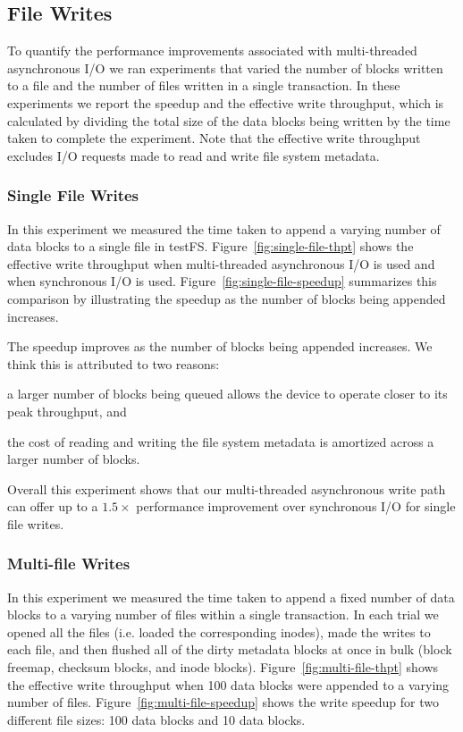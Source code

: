 \subsection{File Writes}
To quantify the performance improvements associated with multi-threaded
asynchronous I/O we ran experiments that varied the number of blocks written to
a file and the number of files written in a single transaction. In these
experiments we report the speedup and the effective write throughput, which is
calculated by dividing the total size of the data blocks being written by the
time taken to complete the experiment. Note that the effective write throughput
excludes I/O requests made to read and write file system metadata.

\subsubsection{Single File Writes}
In this experiment we measured the time taken to append a varying number of
data blocks to a single file in testFS. Figure~\ref{fig:single-file-thpt} shows
the effective write throughput when multi-threaded asynchronous I/O is used and
when synchronous I/O is used. Figure~\ref{fig:single-file-speedup} summarizes
this comparison by illustrating the speedup as the number of blocks being
appended increases.

The speedup improves as the number of blocks being appended increases. We think
this is attributed to two reasons:
\begin{enumerate*}[label={(\roman*)}]
  \item a larger number of blocks being queued allows the device to operate
    closer to its peak throughput, and
  \item the cost of reading and writing the file system metadata is amortized
    across a larger number of blocks.
\end{enumerate*}
Overall this experiment shows that our multi-threaded asynchronous write path
can offer up to a $1.5\times$ performance improvement over synchronous I/O for
single file writes.

\subsubsection{Multi-file Writes}
In this experiment we measured the time taken to append a fixed number of data
blocks to a varying number of files within a single transaction. In each trial
we opened all the files (i.e. loaded the corresponding inodes), made the writes
to each file, and then flushed all of the dirty metadata blocks at once in bulk
(block freemap, checksum blocks, and inode blocks).
Figure~\ref{fig:multi-file-thpt} shows the effective write throughput when
100 data blocks were appended to a varying number of files.
Figure~\ref{fig:multi-file-speedup} shows the write speedup for two different
file sizes: 100 data blocks and 10 data blocks.

